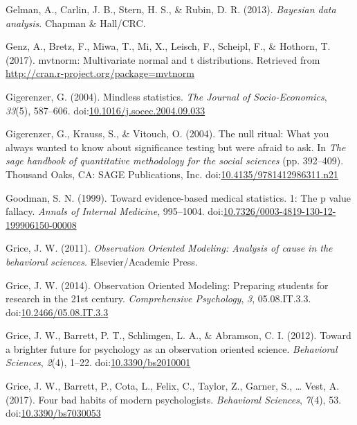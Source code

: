 \documentclass[,man, mask]{apa6}
\theoremstyle{definition}
\theoremstyle{definition}
\theoremstyle{definition}
\theoremstyle{remark}
\begin{document}
\hypertarget{ref-Gelman2004}{}
Gelman, A., Carlin, J. B., Stern, H. S., \& Rubin, D. R. (2013).
\emph{Bayesian data analysis}. Chapman \& Hall/CRC.

\hypertarget{ref-Genz2017}{}
Genz, A., Bretz, F., Miwa, T., Mi, X., Leisch, F., Scheipl, F., \&
Hothorn, T. (2017). mvtnorm: Multivariate normal and t distributions.
Retrieved from \url{http://cran.r-project.org/package=mvtnorm}

\hypertarget{ref-Gigerenzer2004}{}
Gigerenzer, G. (2004). Mindless statistics. \emph{The Journal of
Socio-Economics}, \emph{33}(5), 587--606.
doi:\href{https://doi.org/10.1016/j.socec.2004.09.033}{10.1016/j.socec.2004.09.033}

\hypertarget{ref-Gigerenzer2004a}{}
Gigerenzer, G., Krauss, S., \& Vitouch, O. (2004). The null ritual: What
you always wanted to know about significance testing but were afraid to
ask. In \emph{The sage handbook of quantitative methodology for the
social sciences} (pp. 392--409). Thousand Oaks, CA: SAGE Publications,
Inc.
doi:\href{https://doi.org/10.4135/9781412986311.n21}{10.4135/9781412986311.n21}

\hypertarget{ref-Goodman1999}{}
Goodman, S. N. (1999). Toward evidence-based medical statistics. 1: The
p value fallacy. \emph{Annals of Internal Medicine}, 995--1004.
doi:\href{https://doi.org/10.7326/0003-4819-130-12-199906150-00008}{10.7326/0003-4819-130-12-199906150-00008}

\hypertarget{ref-Grice2011}{}
Grice, J. W. (2011). \emph{Observation Oriented Modeling: Analysis of
cause in the behavioral sciences}. Elsevier/Academic Press.

\hypertarget{ref-Grice2014}{}
Grice, J. W. (2014). Observation Oriented Modeling: Preparing students
for research in the 21st century. \emph{Comprehensive Psychology},
\emph{3}, 05.08.IT.3.3.
doi:\href{https://doi.org/10.2466/05.08.IT.3.3}{10.2466/05.08.IT.3.3}

\hypertarget{ref-Grice2012}{}
Grice, J. W., Barrett, P. T., Schlimgen, L. A., \& Abramson, C. I.
(2012). Toward a brighter future for psychology as an observation
oriented science. \emph{Behavioral Sciences}, \emph{2}(4), 1--22.
doi:\href{https://doi.org/10.3390/bs2010001}{10.3390/bs2010001}

\hypertarget{ref-Grice2017}{}
Grice, J. W., Barrett, P., Cota, L., Felix, C., Taylor, Z., Garner, S.,
\ldots{} Vest, A. (2017). Four bad habits of modern psychologists.
\emph{Behavioral Sciences}, \emph{7}(4), 53.
doi:\href{https://doi.org/10.3390/bs7030053}{10.3390/bs7030053}
\end{document}
